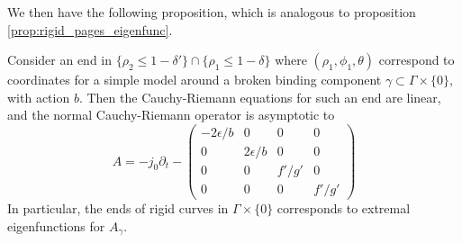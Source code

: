 \documentclass[../main.tex]{subfiles}
\begin{document}
We then have the following proposition, which is analogous to proposition \ref{prop:rigid_pages_eigenfunc}. 

\begin{proposition}\label{prop:simple_asymptotic_5D}
Consider an end in $\{\rho_2\leq 1-\delta'\}\cap \{\rho_1\leq 1-\delta\}$ where $(\rho_1,\phi_1,\theta)$ correspond to coordinates for a simple model around a broken binding component $\gamma\subset \Gamma\times \{0\}$, with action $b$. Then the Cauchy-Riemann equations for such an end are linear, and the normal Cauchy-Riemann operator is asymptotic to $$A = -j_0\partial_t - \begin{pmatrix}
-2\epsilon/b&0&0&0\\
0&2\epsilon/b&0&0\\
0&0&f'/g'&0\\
0&0&0&f'/g'
\end{pmatrix}$$ In particular, the ends of rigid curves in $\Gamma\times \{0\}$ corresponds to extremal eigenfunctions for $A_\gamma$.
\end{proposition}
\end{document}
